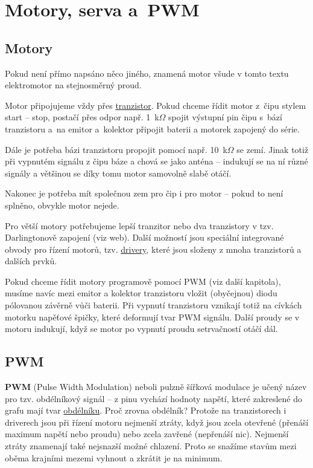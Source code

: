 \section{Motory, serva a~PWM}

\subsection{Motory} \label{motor}

Pokud není přímo napsáno něco jiného, znamená motor všude v tomto textu elektromotor na stejnosměrný proud.

Motor připojujeme vždy přes \hyperlink{tranzistor}{tranzistor}. 
Pokud chceme řídit motor z~čipu stylem start -- stop, postačí přes odpor 
např. 1~k$\Omega$ spojit výstupní pin čipu s~bází tranzistoru a~na emitor a~kolektor připojit baterii a motorek zapojený do série. 

Dále je potřeba bázi tranzistoru propojit pomocí např. 10~k$\Omega$ se zemí. 
Jinak totiž při vypnutém signálu z čipu báze  a chová se jako 
anténa -- indukují se na ní různé signály a většinou se díky tomu motor samovolně slabě otáčí.   

Nakonec je potřeba mít společnou zem pro čip i pro motor -- pokud to není splněno, obvykle motor nejede. 

Pro větší motory potřebujeme lepší tranzitor nebo dva tranzistory v tzv. Darlingtonově zapojení (viz web). 
Další možností jsou speciální integrované obvody pro řízení motorů, tzv.  
 \hyperref[driver]{drivery}, které jsou složeny z mnoha tranzistorů a dalších prvků. 

Pokud chceme řídit motory programově pomocí PWM (viz další kapitola), 
musíme navíc mezi emitor a kolektor tranzistoru vložit (obyčejnou) diodu pólovanou závěrně vůči baterii. 
Při vypnutí tranzistoru vznikají totiž na cívkách motorku napěťové špičky, které deformují tvar PWM signálu.  
Další proudy se v motoru indukují, když se motor po vypnutí proudu setrvačností otáčí dál. 

\subsection{PWM} \label{PWM}   

{\bf PWM}  (Pulse Width Modulation) neboli pulzně šířková modulace je učený název pro tzv. obdélníkový signál -- z pinu vychází hodnoty napětí, které zakreslené do grafu mají tvar 
\href{https://www.arduino.cc/en/Tutorial/PWM}{obdélníku}.
 Proč zrovna obdélník? Protože na tranzistorech i driverech jsou při řízení motoru nejmenší ztráty, když jsou zcela otevřené (přenáší maximum napětí nebo proudu) nebo zcela zavřené (nepřenáší nic). Nejmenší ztráty znamenají také nejsnazší možné chlazení. Proto se snažíme stavům mezi oběma krajními mezemi vyhnout a zkrátit je na minimum. 


